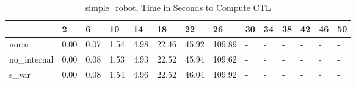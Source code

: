 \begin{table}
\caption{simple_robot, Time in Seconds to Compute CTL}
\label{simple_robot_CTL_time}
\begin{tabular}{llllllllllllll}
\toprule
 & 2 & 6 & 10 & 14 & 18 & 22 & 26 & 30 & 34 & 38 & 42 & 46 & 50 \\
\midrule
norm & 0.00 & 0.07 & 1.54 & 4.98 & 22.46 & 45.92 & 109.89 & - & - & - & - & - & - \\
no_internal & 0.00 & 0.08 & 1.53 & 4.93 & 22.52 & 45.94 & 109.62 & - & - & - & - & - & - \\
s_var & 0.00 & 0.08 & 1.54 & 4.96 & 22.52 & 46.04 & 109.92 & - & - & - & - & - & - \\
\bottomrule
\end{tabular}
\end{table}
